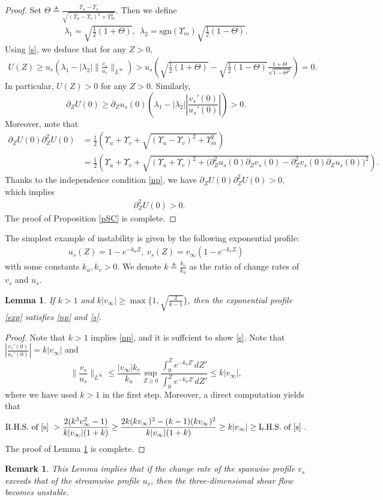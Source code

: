 \documentclass[reqno,11pt]{amsart}
\numberwithin{equation}{section}
\numberwithin{equation}{section}
\theoremstyle{plain}
\newtheorem{lemma}[theorem]{Lemma}
\newtheorem{remark}[theorem]{Remark}
\begin{document}
\begin{proof}
 Set $\Theta\triangleq\frac{\Upsilon_u-\Upsilon_v}{\sqrt{(\Upsilon_u-\Upsilon_v)^2+\Upsilon_m^2}}$.  Then we define
\begin{align}
	\lambda_1=\sqrt{\frac{1}{2}(1+\Theta)},~~	\lambda_2=\mathrm{sgn}(\Upsilon_{m})\sqrt{\frac{1}{2}(1-\Theta)}.\nonumber
\end{align}
 Using \eqref{s}, we deduce that for any $Z>0$, 
	\begin{align*}
		U(Z)\geq u_s\left(\lambda_1-|\lambda_2|\|\frac{v_s}{u_s}\|_{L^\infty}\right)> u_s
		\left(\sqrt{\frac12(1+\Theta)}-\sqrt{\frac{1}{2}(1-\Theta)}\frac{1+\Theta}{\sqrt{1-\Theta^2}}\right)=0.
	\end{align*}
In particular, $U(Z)>0$ for any $Z>0$. Similarly, $$ \partial_ZU(0)\geq \partial_Zu_s(0)\left(\lambda_1-|\lambda_2||\frac{v_s'(0)}{u_s'(0)}|\right)>0.
$$
Moreover, note that
	\begin{align*}
		\partial_ZU(0)\partial_Z^2U(0) &= \frac{1}{2}\left(\Upsilon_u+\Upsilon_v+\sqrt{(\Upsilon_u-\Upsilon_v)^2+\Upsilon_m^2}\right)\\
		&=\frac{1}{2}\left(\Upsilon_u+\Upsilon_v+\sqrt{(\Upsilon_u+\Upsilon_v)^2+
			\Big(\partial_Z^2u_s(0)\partial_Zv_s(0)-\partial_Z^2v_s(0)\partial_Zu_s(0)\Big)^2}\right).
	\end{align*}
Thanks to the independence condition \eqref{np}, we have $\partial_ZU(0)\partial_Z^2U(0)>0$, which implies 
	\begin{align*}
		& \partial_Z^2U(0)>0.
	\end{align*}
The proof of Proposition \ref{pSC} is complete.
\end{proof}
The simplest example of instability is given by the following exponential profile:
	\begin{align}
	\label{exp}
	u_s(Z)=1-e^{-k_{u}Z},~v_s(Z)=v_{\infty}(1-e^{-k_vZ})
\end{align}
with some constants $k_u,k_v>0$. We denote $k\triangleq\frac{k_v}{k_u}$ as the ratio of change rates of $v_s$ and $u_s$. 
\begin{lemma}\label{lmexp}
If $k>1$ and $k|v_{\infty}| \geq \max\{1,\sqrt{\frac{2}{k-1}}\}$, then the exponential profile \eqref{exp} satisfies \eqref{np} and \eqref{s}.
\end{lemma}
\begin{proof}
Note that $k>1$ implies \eqref{np}, and it is suffcient to show \eqref{s}. Note that $|\frac{v_s'(0)}{u_s'(0)}|=k|v_\infty|$ and
	$$\|\frac{v_s}{u_s}\|_{L^\infty}\leq \frac{|v_{\infty}|k_v}{k_u}\sup_{Z\geq 0}\frac{\int_{0}^Ze^{-k_vZ'}d Z'}{\int_{0}^Ze^{-k_uZ'}d Z'}\leq k |v_{\infty}|,$$
	where we have used $k>1$ in the first step. Moreover, a direct computation yields that
	$$\text{R.H.S. of \eqref{s} }>\frac{2(k^3v_{\infty}^2-1)}{k|v_\infty|(1+k)}\geq \frac{2k(kv_{\infty})^2-(k-1)(kv_{\infty})^2}{k|v_\infty|(1+k)}\geq k|v_{\infty}|\geq \text{L.H.S. of \eqref{s} }.
	$$
	The proof of Lemma \ref{lmexp} is complete.
\end{proof}
\begin{remark}
	This Lemma implies that if the change rate of the spanwise profile $v_s$ exceeds that of the streamwise profile $u_s$, then the three-dimensional shear flow becomes unstable.
\end{remark}
\end{document}
